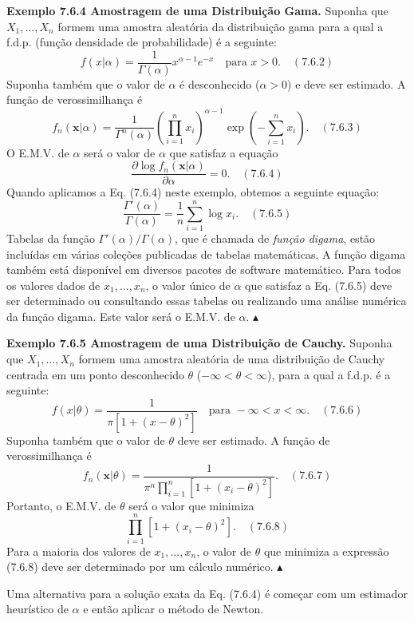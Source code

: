 \textbf{Exemplo 7.6.4 Amostragem de uma Distribuição Gama.} Suponha que $X_1, \dots, X_n$ formem uma amostra aleatória da distribuição gama para a qual a f.d.p. (função densidade de probabilidade) é a seguinte:
$$ f(x|\alpha) = \frac{1}{\Gamma(\alpha)} x^{\alpha-1} e^{-x} \quad \text{para } x > 0. \quad (7.6.2) $$
Suponha também que o valor de $\alpha$ é desconhecido ($\alpha > 0$) e deve ser estimado. A função de verossimilhança é
$$ f_n(\mathbf{x}|\alpha) = \frac{1}{\Gamma^n(\alpha)} \left( \prod_{i=1}^{n} x_i \right)^{\alpha-1} \exp \left( -\sum_{i=1}^{n} x_i \right). \quad (7.6.3) $$
O E.M.V. de $\alpha$ será o valor de $\alpha$ que satisfaz a equação
$$ \frac{\partial \log f_n(\mathbf{x}|\alpha)}{\partial \alpha} = 0. \quad (7.6.4) $$
Quando aplicamos a Eq. (7.6.4) neste exemplo, obtemos a seguinte equação:
$$ \frac{\Gamma'(\alpha)}{\Gamma(\alpha)} = \frac{1}{n} \sum_{i=1}^{n} \log x_i. \quad (7.6.5) $$
Tabelas da função $\Gamma'(\alpha)/\Gamma(\alpha)$, que é chamada de \textit{função digama}, estão incluídas em várias coleções publicadas de tabelas matemáticas. A função digama também está disponível em diversos pacotes de software matemático. Para todos os valores dados de $x_1, \dots, x_n$, o valor único de $\alpha$ que satisfaz a Eq. (7.6.5) deve ser determinado ou consultando essas tabelas ou realizando uma análise numérica da função digama. Este valor será o E.M.V. de $\alpha$. $\blacktriangle$

\textbf{Exemplo 7.6.5 Amostragem de uma Distribuição de Cauchy.} Suponha que $X_1, \dots, X_n$ formem uma amostra aleatória de uma distribuição de Cauchy centrada em um ponto desconhecido $\theta$ ($-\infty < \theta < \infty$), para a qual a f.d.p. é a seguinte:
$$ f(x|\theta) = \frac{1}{\pi [1+(x-\theta)^2]} \quad \text{para } -\infty < x < \infty. \quad (7.6.6) $$
Suponha também que o valor de $\theta$ deve ser estimado. A função de verossimilhança é
$$ f_n(\mathbf{x}|\theta) = \frac{1}{\pi^n \prod_{i=1}^{n} [1+(x_i-\theta)^2]}. \quad (7.6.7) $$
Portanto, o E.M.V. de $\theta$ será o valor que minimiza
$$ \prod_{i=1}^{n} [1+(x_i-\theta)^2]. \quad (7.6.8) $$
Para a maioria dos valores de $x_1, \dots, x_n$, o valor de $\theta$ que minimiza a expressão (7.6.8) deve ser determinado por um cálculo numérico. $\blacktriangle$

Uma alternativa para a solução exata da Eq. (7.6.4) é começar com um estimador heurístico de $\alpha$ e então aplicar o método de Newton.

